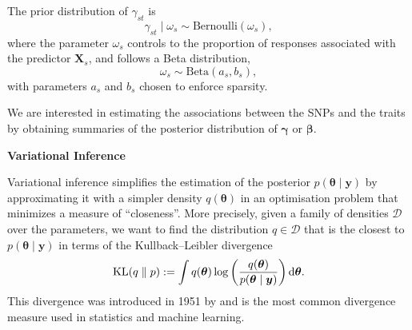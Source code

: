 \documentclass[final]{beamer}
\DeclareMathOperator*{\KL}{{\rm KL}}
\begin{document}
\begin{multicols*}{3}
The prior distribution of $\gamma_{st}$ is
\begin{equation*}
\gamma_{st} \mid \omega_s \sim  \text{Bernoulli}(\omega_s),
\end{equation*}
where the parameter $\omega_s$ controls to the proportion of responses associated with the predictor $\boldsymbol{X}_s$, and follows a Beta distribution,
\begin{equation*}
\omega_s \sim \text{Beta}(a_s, b_s),
\end{equation*}
with parameters $a_s$ and $b_s$ chosen to enforce sparsity. 

We are interested in estimating the associations between the SNPs and the traits by obtaining summaries of the posterior distribution of $\boldsymbol{\gamma}$ or $\boldsymbol{\beta}$.

\vspace{1em}

\textbf{\large Variational Inference}

\vspace{1em}
Variational inference simplifies the estimation of the posterior $p(\boldsymbol{\theta}\mid \boldsymbol{y})$ by approximating it with a simpler density $q(\boldsymbol{\theta})$ in an optimisation problem that minimizes a measure of ``closeness''. More precisely, given a family of densities $\mathcal{D}$ over the parameters, we want to find the distribution \mbox{$q \in \mathcal{D}$} that is the closest to $p(\boldsymbol{\theta} \mid \boldsymbol{y})$ in terms of the Kullback--Leibler divergence
\begin{equation*}
\KL(q\parallel p) := \int q(\boldsymbol{\theta})\log \left(\frac{q(\boldsymbol{\theta})}{p(\boldsymbol{\theta} \mid \boldsymbol{y})}\right) \mathrm{d}\boldsymbol{\theta}.
\end{equation*} 
This divergence was introduced in 1951 by \citet{kl51} and is the most common divergence measure used in statistics and machine learning. 


\end{multicols*}
\end{document}
